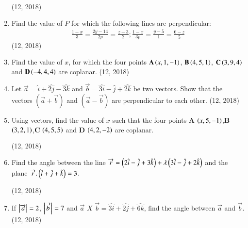 \begin{enumerate}[label=\thesubsection.\arabic*, ref=\thesubsection.\theenumi]
\hfill (12, 2018)
\item Find the value of $P$ for which the following lines are perpendicular:
 \begin{align*}
 \frac{1-x}{3}=\frac{2y-14}{2p}=\frac{z-3}{2}; \frac{1-x}{3p}=\frac{y-5}{1}=\frac{6-z}{5}
 \end{align*}
 \hfill (12, 2018)
\item Find the value of $x$, for which the four points $\mathbf{A}\left(x,1,-1\right)$, $\mathbf{B}\left(4,5,1\right)$, $\mathbf{C}\left(3,9,4\right)$ and $\mathbf{D}\left(-4,4,4\right)$ are coplanar.
\hfill (12, 2018)
\item Let $\vec{a}=\hat{i}+\hat{2j}-\hat{3k}$ and $\vec{b}=\hat{3i}-\hat{j}+\hat{2k}$ be two vectors. Show that the vectors $(\vec{a}+\vec{b})$ and $(\vec{a}-\vec{b})$ are perpendicular to each other.
\hfill (12, 2018)
\item Using vectors, find the value of $x$ such that the four points $\mathbf{A}$ $\left(x,5,-1\right)$,$\mathbf{B}$ $\left(3,2,1\right)$,$\mathbf{C}$ $\left(4,5,5\right)$ and $\mathbf{D}$ $\left(4,2,-2\right)$ are coplanar.

\hfill (12, 2018) 
\item Find the angle between the line $\overrightarrow{r}=\left(2\hat{i}-\hat{j}+3\hat{k}\right)+\lambda\left(3\hat{i}-\hat{j}+2\hat{k}\right)$ and the plane $\overrightarrow{r}.\left(\hat{i}+\hat{j}+\hat{k}\right)=3$.

\hfill (12, 2018) 
\item If $\left\vert\overrightarrow{a}\right\vert=2$, $\left\vert\overrightarrow{b}\right\vert=7$ and  $\overrightarrow{a}$ $X$ $\overrightarrow{b} =\hat{3i}+\hat{2j}+\hat{6k}$, find the angle between $\overrightarrow{a}$ and $\overrightarrow{b}$.
\hfill (12, 2018) 
\end{enumerate}
